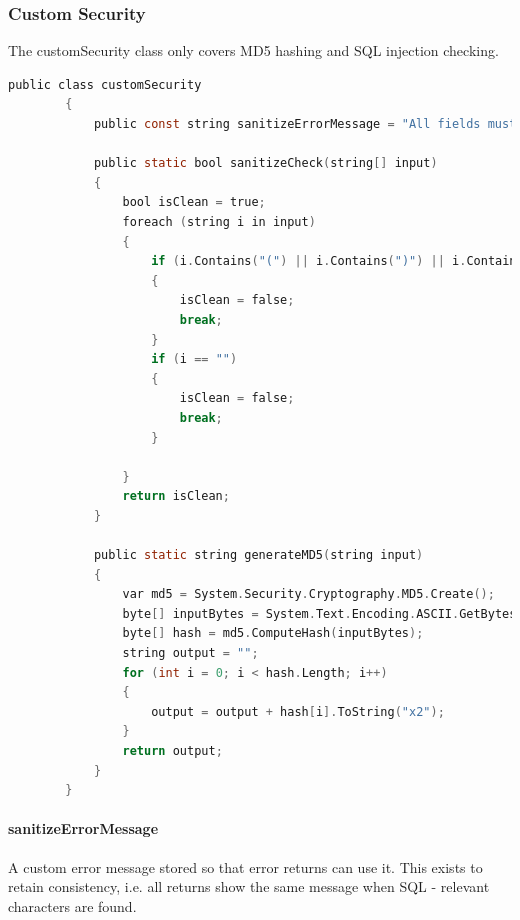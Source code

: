 ﻿\documentclass{article}
\begin{document}
    \subsubsection{Custom Security}
    The customSecurity class only covers MD5 hashing and SQL injection checking.
    \begin{lstlisting}[language=C]
        public class customSecurity
        {
            public const string sanitizeErrorMessage = "All fields must be full. The (, ), +, -, = and ' characters are not allowed in ANY fields";

            public static bool sanitizeCheck(string[] input)
            {
                bool isClean = true;
                foreach (string i in input)
                {
                    if (i.Contains("(") || i.Contains(")") || i.Contains("'") || i.Contains("=") || i.Contains("-") || i.Contains("+"))
                    {
                        isClean = false;
                        break;
                    }
                    if (i == "")
                    {
                        isClean = false;
                        break;
                    }

                }
                return isClean;
            }

            public static string generateMD5(string input)
            {
                var md5 = System.Security.Cryptography.MD5.Create();
                byte[] inputBytes = System.Text.Encoding.ASCII.GetBytes(input);
                byte[] hash = md5.ComputeHash(inputBytes);
                string output = "";
                for (int i = 0; i < hash.Length; i++)
                {
                    output = output + hash[i].ToString("x2");
                }
                return output;
            }
        }
    \end{lstlisting}
    \paragraph{sanitizeErrorMessage}
    A custom error message stored so that error returns can use it.
    This exists to retain consistency, i.e. all returns show the same message when SQL - relevant characters are found.
\end{document}
